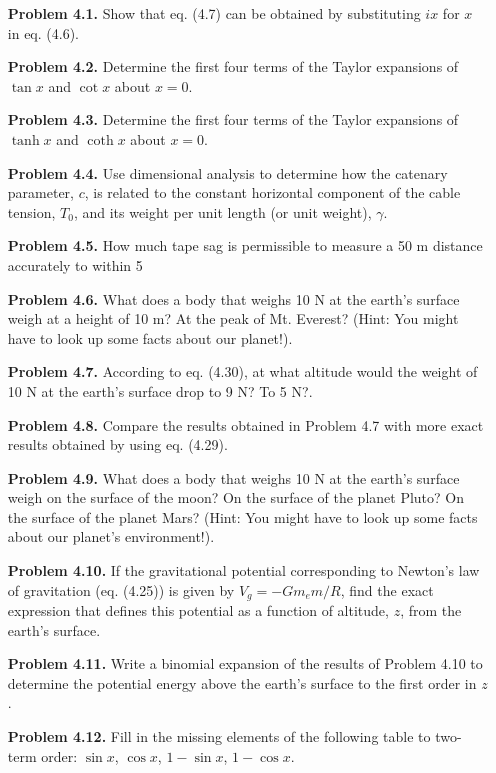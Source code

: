 \begin{enumerate}
    \item[\textbf{Problem 4.1.}] Show that eq. (4.7) can be obtained by substituting $ix$ for $x$ in eq. (4.6).
    \item[\textbf{Problem 4.2.}] Determine the first four terms of the Taylor expansions of $\tan x$ and $\cot x$ about $x = 0$.
    \item[\textbf{Problem 4.3.}] Determine the first four terms of the Taylor expansions of $\tanh x$ and $\coth x$ about $x = 0$.
    \item[\textbf{Problem 4.4.}] Use dimensional analysis to determine how the catenary parameter, $c$, is related to the constant horizontal component of the cable tension, $T_0$, and its weight per unit length (or unit weight), $\gamma$.
    \item[\textbf{Problem 4.5.}] How much tape sag is permissible to measure a 50 m distance accurately to within 5%
    \item[\textbf{Problem 4.6.}] What does a body that weighs 10 N at the earth’s surface weigh at a height of 10 m? At the peak of Mt. Everest? (Hint: You might have to look up some facts about our planet!).
    \item[\textbf{Problem 4.7.}] According to eq. (4.30), at what altitude would the weight of 10 N at the earth’s surface drop to 9 N? To 5 N?.
    \item[\textbf{Problem 4.8.}] Compare the results obtained in Problem 4.7 with more exact results obtained by using eq. (4.29).
    \item[\textbf{Problem 4.9.}] What does a body that weighs 10 N at the earth’s surface weigh on the surface of the moon? On the surface of the planet Pluto? On the surface of the planet Mars? (Hint: You might have to look up some facts about our planet’s environment!).
    \item[\textbf{Problem 4.10.}] If the gravitational potential corresponding to Newton’s law of gravitation (eq. (4.25)) is given by $V_g = -Gm_em / R$, find the exact expression that defines this potential as a function of altitude, $z$, from the earth’s surface.
    \item[\textbf{Problem 4.11.}] Write a binomial expansion of the results of Problem 4.10 to determine the potential energy above the earth’s surface to the first order in $z$.
    \item[\textbf{Problem 4.12.}] Fill in the missing elements of the following table to two-term order: $\sin x$, $\cos x$, $1-\sin x$, $1-\cos x$.

\end{enumerate}
